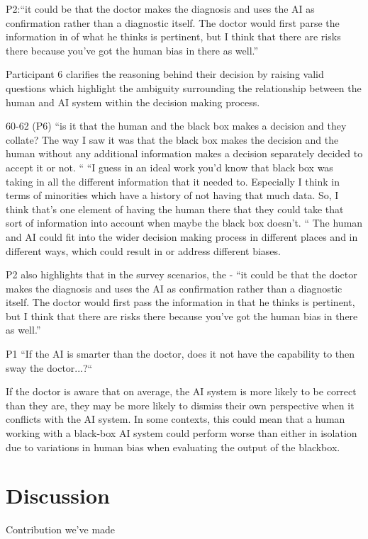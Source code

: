 \documentclass[manuscript,screen,review]{acmart}
\begin{document}
P2:“it could be that the doctor makes the diagnosis and uses the AI as confirmation rather than a diagnostic itself. The doctor would first parse the information in of what he thinks is pertinent, but I think that there are risks there because you’ve got the human bias in there as well.”

Participant 6 clarifies the reasoning behind their decision by raising valid questions which highlight the ambiguity surrounding the relationship between the  human and AI system within the decision making process.

60-62 (P6)
“is it that the human and the black box makes a decision and they collate? The way I saw it was that the black box makes the decision and the human without any additional information makes a decision separately decided to accept it or not. “
“I guess in an ideal work you'd know that black box was taking in all the different information that it needed to. Especially I think in terms of minorities which have a history of not having that much data. So, I think that’s one element of having the human there that they could take that sort of information into account when maybe the black box doesn’t. “
The human and AI could fit into the wider decision making process in different places and in different ways, which could result in or address different biases.

P2 also highlights that in the survey scenarios, the  - “it could be that the doctor makes the diagnosis and uses the AI as confirmation rather than a diagnostic itself. The doctor would first pass the information in that he thinks is pertinent, but I think that there are risks there because you’ve got the human bias in there as well.”

P1 “If the AI is smarter than the doctor, does it not have the capability to then sway the doctor...?“

If the doctor is aware that on average, the AI system is more likely to be correct than they are, they may be more likely to dismiss their own perspective when it conflicts with the AI system. In some contexts, this could mean that a human working with a black-box AI system could perform worse than either in isolation due to variations in human bias when evaluating the output of the blackbox. 





\section{Discussion}
Contribution we've made
\end{document}
